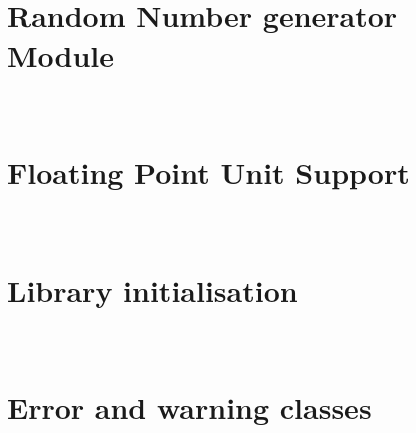 \documentclass{manual}
\makeatletter
\let\py@OldOldChapter=\chapter
\renewcommand{\chapter}{\py@reset%
                        \py@OldOldChapter}
\makeatother
\begin{document}
\chapter[\protect\module{pygsl.rng} --- Random Number generator
Module]{\protect{} \\ Random Number generator Module}
\label{cha:rng-module}


\chapter[\protect\module{pygsl.ieee} --- Floating Point Unit Support]
{\protect{} \\ Floating Point Unit Support}
\label{cha:ieee-module}


\chapter[\protect\module{pygsl.init} --- Library initialisation]
{\protect{} \\ Library initialisation}
\label{cha:library-initialisation}


\chapter[\protect\module{pygsl.errors} --- Error and warning classes]
{\protect{} \\ Error and warning classes} 
\label{cha:error-module}



\end{document}
